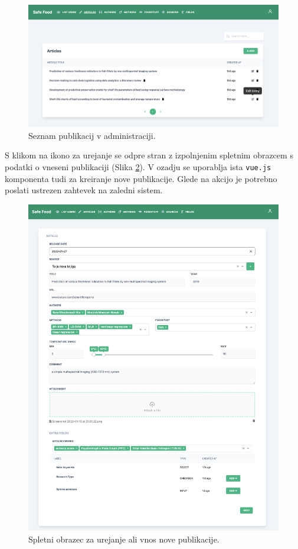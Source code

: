 \begin{figure}[h]
\begin{center}
\includegraphics[width=1\textwidth]{slike/list-articles.png}
\end{center}
\caption{ Seznam publikacij v administraciji. }
\label{list-articles}
\end{figure}

S klikom na ikono za urejanje se odpre stran z izpolnjenim spletnim obrazcem s podatki o vneseni publikaciji (Slika \ref{edit-articles}). V ozadju se uporablja ista \verb=vue.js= komponenta tudi za kreiranje nove publikacije. Glede na akcijo je potrebno poslati ustrezen zahtevek na zaledni sistem.

\begin{figure}[h]
\begin{center}
\includegraphics[width=1\textwidth]{slike/form-create-article.png}
\end{center}
\caption{ Spletni obrazec za urejanje ali vnos nove publikacije. }
\label{edit-articles}
\end{figure}

